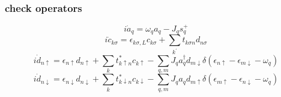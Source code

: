 \documentclass[aps,prb,onecolumn,amssymb,amsmath,superscriptaddress]{revtex4-1}
\begin{document}
\subsubsection{check operators}
\begin{equation}
i \dot{a}_{q}=\omega_{q} a_{q}-J_{q} s_{q}^{+}
\end{equation}
\begin{equation}
i \dot{c}_{k \sigma}=\epsilon_{k \sigma, L} c_{k \sigma}+\sum_{k^{\prime}} t_{k \sigma n} d_{n \sigma}
\end{equation}
\begin{equation}
i \dot{d}_{n \uparrow}=\epsilon_{n \uparrow} d_{n \uparrow}+\sum_{k} t_{k \uparrow n}^{*} c_{k \uparrow}-\sum_{q, m} J_{q} a_{q}^{\dagger}d_{m \downarrow}\delta(\epsilon_{n \uparrow}-\epsilon_{m \downarrow}-\omega_{q})
\end{equation}
\begin{equation}
i \dot{d}_{n \downarrow}=\epsilon_{n \downarrow} d_{n \downarrow}+\sum_{k} t_{k \downarrow n}^{*} c_{k \downarrow}-\sum_{q, m} J_{q} a_{q}d_{m \uparrow}\delta(\epsilon_{m \uparrow}-\epsilon_{n \downarrow}-\omega_{q})
\end{equation}
\end{document}

